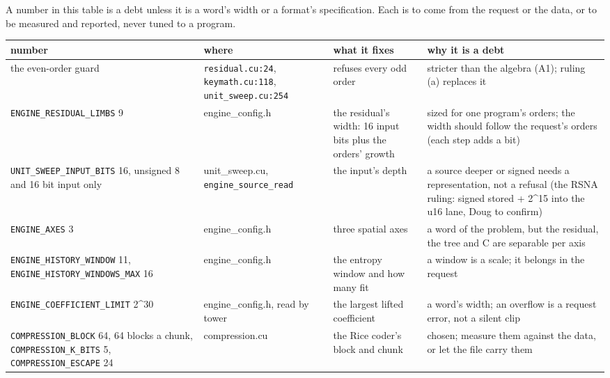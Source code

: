 A number in this table is a debt unless it is a word's width or a format's specification. Each is to come from the request or the data, or to be measured and reported, never tuned to a program.

{\footnotesize
\setlength{\tabcolsep}{6pt}
\begin{longtable}{>{\RaggedRight\arraybackslash}p{}>{\RaggedRight\arraybackslash}p{}>{\RaggedRight\arraybackslash}p{}>{\RaggedRight\arraybackslash}p{}}
\toprule
number & where & what it fixes & why it is a debt \\
\midrule
\endhead
the even-order guard & \texttt{residual.\allowbreak{}cu:24}, \texttt{keymath.\allowbreak{}cu:118}, \texttt{unit\_\allowbreak{}sweep.\allowbreak{}cu:254} & refuses every odd order & stricter than the algebra (A1); ruling (a) replaces it \\
\texttt{ENGINE\_\allowbreak{}RESIDUAL\_\allowbreak{}LIMBS} 9 & engine\_\allowbreak{}config.h & the residual's width: 16 input bits plus the orders' growth & sized for one program's orders; the width should follow the request's orders (each step adds a bit) \\
\texttt{UNIT\_\allowbreak{}SWEEP\_\allowbreak{}INPUT\_\allowbreak{}BITS} 16, unsigned 8 and 16 bit input only & unit\_\allowbreak{}sweep.cu, \texttt{engine\_\allowbreak{}source\_\allowbreak{}read} & the input's depth & a source deeper or signed needs a representation, not a refusal (the RSNA ruling: signed stored + 2\textasciicircum{}15 into the u16 lane, Doug to confirm) \\
\texttt{ENGINE\_\allowbreak{}AXES} 3 & engine\_\allowbreak{}config.h & three spatial axes & a word of the problem, but the residual, the tree and C are separable per axis \\
\texttt{ENGINE\_\allowbreak{}HISTORY\_\allowbreak{}WINDOW} 11, \texttt{ENGINE\_\allowbreak{}HISTORY\_\allowbreak{}WINDOWS\_\allowbreak{}MAX} 16 & engine\_\allowbreak{}config.h & the entropy window and how many fit & a window is a scale; it belongs in the request \\
\texttt{ENGINE\_\allowbreak{}COEFFICIENT\_\allowbreak{}LIMIT} 2\textasciicircum{}30 & engine\_\allowbreak{}config.h, read by tower & the largest lifted coefficient & a word's width; an overflow is a request error, not a silent clip \\
\texttt{COMPRESSION\_\allowbreak{}BLOCK} 64, 64 blocks a chunk, \texttt{COMPRESSION\_\allowbreak{}K\_\allowbreak{}BITS} 5, \texttt{COMPRESSION\_\allowbreak{}ESCAPE} 24 & compression.cu & the Rice coder's block and chunk & chosen; measure them against the data, or let the file carry them \\

\end{longtable}}
